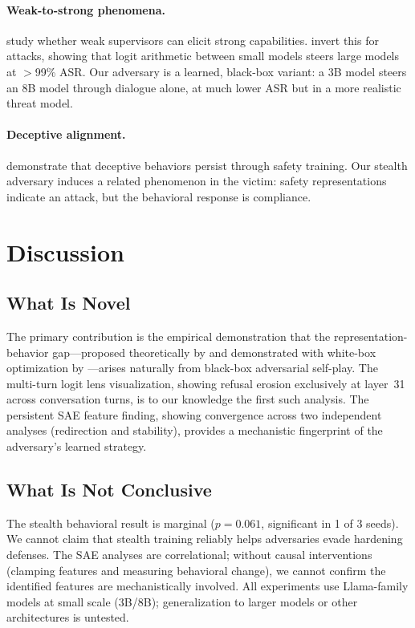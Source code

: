 \documentclass[11pt]{article}
\begin{document}
\paragraph{Weak-to-strong phenomena.}
\citet{burns2023weaktostrong} study whether weak supervisors can elicit strong capabilities.
\citet{zhao2025weaktostrong} invert this for attacks, showing that logit arithmetic between small models steers large models at $>$99\% ASR.
Our adversary is a learned, black-box variant: a 3B model steers an 8B model through dialogue alone, at much lower ASR but in a more realistic threat model.

\paragraph{Deceptive alignment.}
\citet{hubinger2024sleeper} demonstrate that deceptive behaviors persist through safety training.
Our stealth adversary induces a related phenomenon in the victim: safety representations indicate an attack, but the behavioral response is compliance.

\section{Discussion}
\label{sec:discussion}

\subsection{What Is Novel}

The primary contribution is the empirical demonstration that the representation-behavior gap---proposed theoretically by \citet{wu2026knowingwithoutacting} and demonstrated with white-box optimization by \citet{bailey2024obfuscated}---arises naturally from black-box adversarial self-play.
The multi-turn logit lens visualization, showing refusal erosion exclusively at layer~31 across conversation turns, is to our knowledge the first such analysis.
The persistent SAE feature finding, showing convergence across two independent analyses (redirection and stability), provides a mechanistic fingerprint of the adversary's learned strategy.

\subsection{What Is Not Conclusive}

The stealth behavioral result is marginal ($p=0.061$, significant in 1 of 3 seeds).
We cannot claim that stealth training reliably helps adversaries evade hardening defenses.
The SAE analyses are correlational; without causal interventions (clamping features and measuring behavioral change), we cannot confirm the identified features are mechanistically involved.
All experiments use Llama-family models at small scale (3B/8B); generalization to larger models or other architectures is untested.
\end{document}
